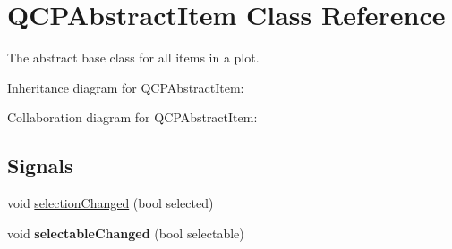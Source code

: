 \hypertarget{class_q_c_p_abstract_item}{}\section{Q\+C\+P\+Abstract\+Item Class Reference}
\label{class_q_c_p_abstract_item}


The abstract base class for all items in a plot.  




Inheritance diagram for Q\+C\+P\+Abstract\+Item\+:


Collaboration diagram for Q\+C\+P\+Abstract\+Item\+:
\subsection*{Signals}
\begin{DoxyCompactItemize}
\item 
void \hyperlink{class_q_c_p_abstract_item_aa5cffb034fc65dbb91c77e02c1c14251}{selection\+Changed} (bool selected)
\item 
void {\bfseries selectable\+Changed} (bool selectable)\hypertarget{class_q_c_p_abstract_item_a5b266c11aac61cb511901f3911dac2a3}{}\label{class_q_c_p_abstract_item_a5b266c11aac61cb511901f3911dac2a3}

\end{DoxyCompactItemize}
